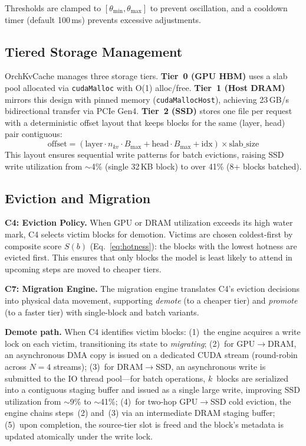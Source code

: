 \documentclass[conference]{IEEEtran}
\begin{document}
Thresholds are clamped to $[\theta_{\min}, \theta_{\max}]$ to prevent oscillation, and a cooldown timer (default 100\,ms) prevents excessive adjustments.

\subsection{Tiered Storage Management}
\label{sec:tiered-storage}

OrchKvCache manages three storage tiers.
\textbf{Tier~0 (GPU HBM)} uses a slab pool allocated via \texttt{cudaMalloc} with O(1) alloc/free.
\textbf{Tier~1 (Host DRAM)} mirrors this design with pinned memory (\texttt{cudaMallocHost}), achieving 23\,GB/s bidirectional transfer via PCIe Gen4.
\textbf{Tier~2 (SSD)} stores one file per request with a deterministic offset layout that keeps blocks for the same (layer, head) pair contiguous:
\begin{equation}
\text{offset} = (\text{layer} \cdot n_{kv} \cdot B_{\max} + \text{head} \cdot B_{\max} + \text{idx}) \times \text{slab\_size}
\end{equation}
This layout ensures sequential write patterns for batch evictions, raising SSD write utilization from ${\sim}$4\% (single 32\,KB block) to over 41\% (8+ blocks batched).

\subsection{Eviction and Migration}

\textbf{C4: Eviction Policy.} When GPU or DRAM utilization exceeds its high water mark, C4 selects victim blocks for demotion. Victims are chosen coldest-first by composite score $S(b)$ (Eq.~\ref{eq:hotness}): the blocks with the lowest hotness are evicted first. This ensures that only blocks the model is least likely to attend in upcoming steps are moved to cheaper tiers.

\textbf{C7: Migration Engine.} The migration engine translates C4's eviction decisions into physical data movement, supporting \emph{demote} (to a cheaper tier) and \emph{promote} (to a faster tier) with single-block and batch variants.

\textbf{Demote path.} When C4 identifies victim blocks:
(1)~the engine acquires a write lock on each victim, transitioning its state to \emph{migrating};
(2)~for GPU$\to$DRAM, an asynchronous DMA copy is issued on a dedicated CUDA stream (round-robin across $N{=}4$ streams);
(3)~for DRAM$\to$SSD, an asynchronous write is submitted to the IO thread pool---for batch operations, $k$~blocks are serialized into a contiguous staging buffer and issued as a single large write, improving SSD utilization from ${\sim}$9\% to ${\sim}$41\%;
(4)~for two-hop GPU$\to$SSD cold eviction, the engine chains steps~(2) and~(3) via an intermediate DRAM staging buffer;
(5)~upon completion, the source-tier slot is freed and the block's metadata is updated atomically under the write lock.
\end{document}
